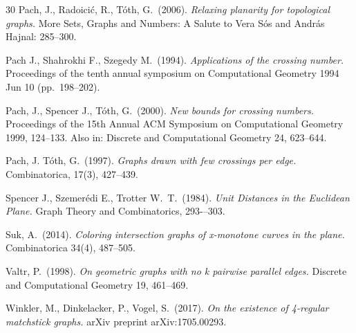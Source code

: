 \documentclass[a4paper,10pt]{article}
\begin{document}
\begin{thebibliography}{30}
Pach, J., Radoici\'c, R., T\'oth, G.\ (2006).
{\it Relaxing planarity for topological graphs.}
More Sets, Graphs and Numbers: A Salute to Vera S\'os and Andr\'as Hajnal: 285--300.

Pach J., Shahrokhi F., Szegedy M.\ (1994). 
{\it Applications of the crossing number.} 
Proceedings of the tenth annual symposium on Computational Geometry 1994 Jun 10 (pp.\ 198--202).


Pach, J., Spencer J., T\'oth, G.\ (2000).
{\it  New bounds for crossing numbers.}
Proceedings of the 15th Annual ACM Symposium on Computational Geometry 1999, 124--133. 
Also in: Discrete and Computational Geometry 24, 623--644.


Pach, J. T\'oth, G.\ (1997).
{\it Graphs drawn with few crossings per edge.}
Combinatorica, 17(3), 427--439.

Spencer J., Szemer\'edi E., Trotter W.\ T.\ (1984).
{\it Unit Distances in the Euclidean Plane.}
Graph Theory and Combinatorics, 293-–303.

Suk, A.\ (2014).
{\it Coloring intersection graphs of x-monotone curves in the plane.} 
Combinatorica 34(4), 487--505.

Valtr, P.\ (1998).
{\it On geometric graphs with no k pairwise parallel edges.}
Discrete and Computational Geometry 19, 461--469.

Winkler, M., Dinkelacker, P., Vogel, S.\ (2017).
{\it On the existence of 4-regular matchstick graphs.}
arXiv preprint arXiv:1705.00293.

\end{thebibliography}
\end{document}

